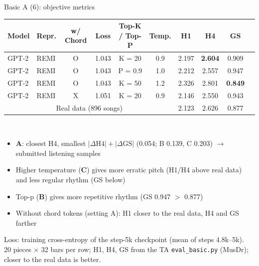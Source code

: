 \documentclass[aspectratio=169,11pt]{beamer}
\newcommand{\best}[1]{\textbf{\alert{#1}}}                       %
\newenvironment{tight}{\begin{itemize}\setlength{\itemsep}{1.5pt}\setlength{\parskip}{0pt}\setlength{\topsep}{0pt}}{\end{itemize}}
\newcommand{\src}[1]{\vfill{\scriptsize\color{gray}#1}}          %
\begin{document}
\begin{frame}[t]{Basic A (6): objective metrics}
  \centering\small
  \begin{tabular}{@{}llcccccccc@{}}
    \toprule
    Model & Repr. & w/ Chord & Loss & Top-K / Top-P & Temp. & H1 & H4 & GS \\
    \midrule
    GPT-2 & REMI & O & 1.043 & K = 20 & 0.9 & 2.197 & \best{2.604} & 0.909 \\
    GPT-2 & REMI & O & 1.043 & P = 0.9 & 1.0 & 2.212 & 2.557 & 0.947 \\
    GPT-2 & REMI & O & 1.043 & K = 50 & 1.2 & 2.326 & 2.801 & \best{0.849} \\
    GPT-2 & REMI & X & 1.051 & K = 20 & 0.9 & 2.146 & 2.550 & 0.943 \\
    \midrule
    \multicolumn{6}{c}{Real data (896 songs)} & 2.123 & 2.626 & 0.877 \\
    \bottomrule
  \end{tabular}\\[0.6em]
  \raggedright
  \begin{tight}\small
    \item \textbf{A}: closest H4, smallest $|\Delta\mathrm{H4}| + |\Delta\mathrm{GS}|$ (0.054; B 0.139, C 0.203) $\rightarrow$ submitted listening samples
    \item Higher temperature (\textbf{C}) gives more erratic pitch (H1/H4 above real data) and less regular rhythm (GS below)
    \item Top-p (\textbf{B}) gives more repetitive rhythm (GS 0.947 $>$ 0.877)
    \item Without chord tokens (setting A): H1 closer to the real data, H4 and GS farther
  \end{tight}
  \src{Loss: training cross-entropy of the step-5k checkpoint (mean of steps 4.8k--5k).\\ 20 pieces $\times$ 32 bars per row; H1, H4, GS from the TA \texttt{eval\_basic.py} (MusDr); closer to the real data is better.}
\end{frame}

\end{document}
